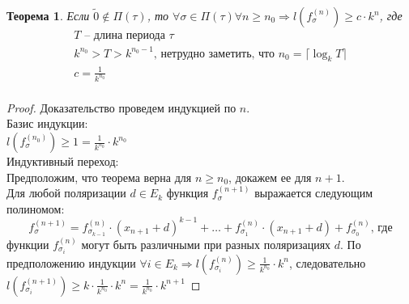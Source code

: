 \documentclass[bibliography=totoc, a4paper, 14pt]{extarticle}
\newtheorem{myth}{Теорема}
\begin{document}
\begin{myth}
\label{th2}
Если $\tilde{0} \not\in \Pi(\tau)$, то $\forall \sigma \in \Pi(\tau) \forall n \geqslant n_0 \Rightarrow 
l(f_{\sigma}^{(n)}) \geqslant c \cdot k^n$, где
$$
\begin{array}{l}
T \text{ -- длина периода }\tau \\
k^{n_0} > T > k^{n_0 - 1} \text{, нетрудно заметить, что } n_0 = \lceil \log_kT \rceil \\
c = \frac{1}{k^{n_0}} \\
\end{array}
$$
\end{myth}
\begin{proof}
Доказательство проведем индукцией по $n$. \\
Базис индукции: \\
$l(f_{\sigma}^{(n_0)}) \geqslant 1 = \frac{1}{k^{n_0}} \cdot k^{n_0}$ \\
Индуктивный переход:\\
Предположим, что теорема верна для $n \geqslant n_0$, докажем ее для $n+1$.\\
Для любой поляризации $d \in E_k$ функция $f_{\sigma}^{(n+1)}$ выражается следующим полиномом:
$$f_{\sigma}^{(n+1)} = f_{\sigma_{k-1}}^{(n)}\cdot(x_{n+1}+d)^{k-1} + \ldots +
f_{\sigma_1}^{(n)}\cdot(x_{n+1}+d) + f^{(n)}_{\sigma_0} \text{, где} $$
функции $f_{\sigma_i}^{(n)}$ могут быть различными при разных поляризациях $d$.
По предположению индукции $\forall i \in E_k \Rightarrow l(f_{\sigma_i}^{(n)}) \geqslant
\frac{1}{k^{n_0}} \cdot k^n$, следовательно $l(f_{\sigma_i}^{(n+1)}) \geqslant
k \cdot \frac{1}{k^{n_0}} \cdot k^n = \frac{1}{k^{n_0}} \cdot k^{n+1}$
\end{proof}
\end{document}
